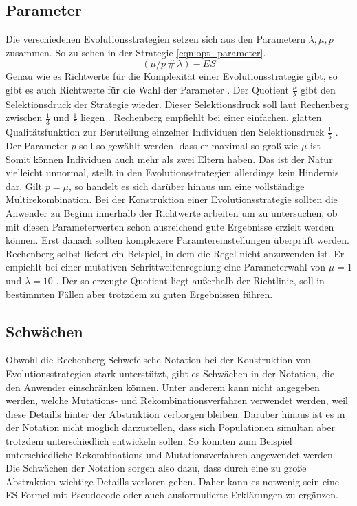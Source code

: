 \subsection{Parameter}
Die verschiedenen Evolutionsstrategien setzen sich aus den Parametern $\lambda, \mu, p$ zusammen. So zu sehen in der Strategie \ref{eqn:opt_parameter}.
\begin{equation}
\label{eqn:opt_parameter}
(\mu/p\,\#\,\lambda)-ES
\end{equation}
Genau wie es Richtwerte für die Komplexität einer Evolutionsstrategie gibt, so gibt es auch Richtwerte für die Wahl der Parameter \cite[S.166]{schoeneburg}.
Der Quotient $\frac{\mu}{\lambda}$ gibt den Selektionsdruck der Strategie wieder. Dieser Selektionsdruck soll laut Rechenberg zwischen $\frac{1}{3}$ und $\frac{1}{5}$ liegen  \cite[S.166]{schoeneburg}. Rechenberg empfiehlt bei einer einfachen, glatten Qualitätsfunktion zur Beruteilung einzelner Individuen den Selektionsdruck  $\frac{1}{5}$  \cite[S.166]{schoeneburg}.
Der Parameter $p$ soll so gewählt werden, dass er maximal so groß wie $\mu$ ist  \cite[S.166]{schoeneburg}. Somit können Individuen auch mehr als zwei Eltern haben. Das ist der Natur vielleicht unnormal, stellt in den Evolutionsstrategien allerdings kein Hindernis dar. Gilt $p=\mu$, so handelt es sich darüber hinaus um eine vollständige Multirekombination.
Bei der Konstruktion einer Evolutionsstrategie sollten die Anwender zu Beginn innerhalb der Richtwerte arbeiten um zu untersuchen, ob mit diesen Parameterwerten schon ausreichend gute Ergebnisse erzielt werden können. Erst danach sollten komplexere Paramtereinstellungen überprüft werden.
Rechenberg selbst liefert ein Beispiel, in dem die Regel nicht anzuwenden ist. Er empiehlt bei einer mutativen Schrittweitenregelung eine Parameterwahl von $\mu=1$ und $\lambda=10$  \cite[S.166]{schoeneburg}. Der so erzeugte Quotient liegt außerhalb der Richtlinie, soll in bestimmten Fällen aber trotzdem zu guten Ergebnissen führen.

\subsection{Schwächen}
Obwohl die Rechenberg-Schwefelsche Notation bei der Konstruktion von Evolutionsstrategien stark unterstützt, gibt es Schwächen in der Notation, die den Anwender einschränken können.
Unter anderem kann nicht angegeben werden, welche Mutations- und Rekombinationsverfahren verwendet werden, weil diese Detaills hinter der Abstraktion verborgen bleiben.
Darüber hinaus ist es in der Notation nicht möglich darzustellen, dass sich Populationen simultan aber trotzdem unterschiedlich entwickeln sollen. So könnten zum Beispiel unterschiedliche Rekombinations und Mutationsverfahren angewendet werden.
Die Schwächen der Notation sorgen also dazu, dass durch eine zu große Abstraktion wichtige Detaills verloren gehen. Daher kann es notwenig sein eine ES-Formel mit Pseudocode oder auch ausformulierte Erklärungen zu ergänzen. 